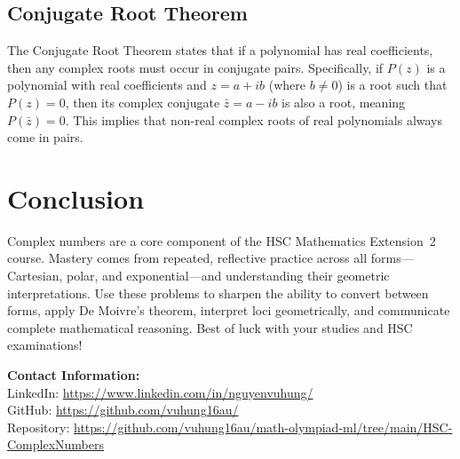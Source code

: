 \documentclass[12pt]{article}
\begin{document}
\subsection{Conjugate Root Theorem}
The Conjugate Root Theorem states that if a polynomial has real coefficients, then any complex roots must occur in conjugate pairs. Specifically, if $P(z)$ is a polynomial with real coefficients and $z = a + ib$ (where $b \neq 0$) is a root such that $P(z) = 0$, then its complex conjugate $\bar{z} = a - ib$ is also a root, meaning $P(\bar{z}) = 0$. This implies that non-real complex roots of real polynomials always come in pairs.

\section{Conclusion}
Complex numbers are a core component of the HSC Mathematics Extension~2 course. Mastery comes from repeated, reflective practice across all forms---Cartesian, polar, and exponential---and understanding their geometric interpretations. Use these problems to sharpen the ability to convert between forms, apply De Moivre's theorem, interpret loci geometrically, and communicate complete mathematical reasoning. Best of luck with your studies and HSC examinations!

\vspace{2em}
\noindent\textbf{Contact Information:}\\[0.5em]
LinkedIn: \href{https://www.linkedin.com/in/nguyenvuhung/}{https://www.linkedin.com/in/nguyenvuhung/}\\[0.3em]
GitHub: \href{https://github.com/vuhung16au/}{https://github.com/vuhung16au/}\\[0.3em]
Repository: \href{https://github.com/vuhung16au/math-olympiad-ml/tree/main/HSC-ComplexNumbers}{https://github.com/vuhung16au/math-olympiad-ml/tree/main/HSC-ComplexNumbers}
\end{document}
